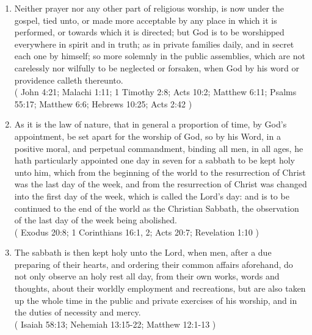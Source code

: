 \documentclass[12pt,a4paper]{book}
\begin{document}
\begin{enumerate}
	\item Neither prayer nor any other part of religious worship, is now under the gospel, tied unto, or made more acceptable by any place in which it is performed, or towards which it is directed; but God is to be worshipped everywhere in spirit and in truth; as in private families daily, and in secret each one by himself; so more solemnly in the public assemblies, which are not carelessly nor wilfully to be neglected or forsaken, when God by his word or providence calleth thereunto.\\
( John 4:21; Malachi 1:11; 1 Timothy 2:8; Acts 10:2; Matthew 6:11; Psalms 55:17; Matthew 6:6; Hebrews 10:25; Acts 2:42 )
\item As it is the law of nature, that in general a proportion of time, by God's appointment, be set apart for the worship of God, so by his Word, in a positive moral, and perpetual commandment, binding all men, in all ages, he hath particularly appointed one day in seven for a sabbath to be kept holy unto him, which from the beginning of the world to the resurrection of Christ was the last day of the week, and from the resurrection of Christ was changed into the first day of the week, which is called the Lord's day: and is to be continued to the end of the world as the Christian Sabbath, the observation of the last day of the week being abolished.\\
( Exodus 20:8; 1 Corinthians 16:1, 2; Acts 20:7; Revelation 1:10 )
\item The sabbath is then kept holy unto the Lord, when men, after a due preparing of their hearts, and ordering their common affairs aforehand, do not only observe an holy rest all day, from their own works, words and thoughts, about their worldly employment and recreations, but are also taken up the whole time in the public and private exercises of his worship, and in the duties of necessity and mercy.\\
( Isaiah 58:13; Nehemiah 13:15-22; Matthew 12:1-13 )
\end{enumerate}
\end{document}
